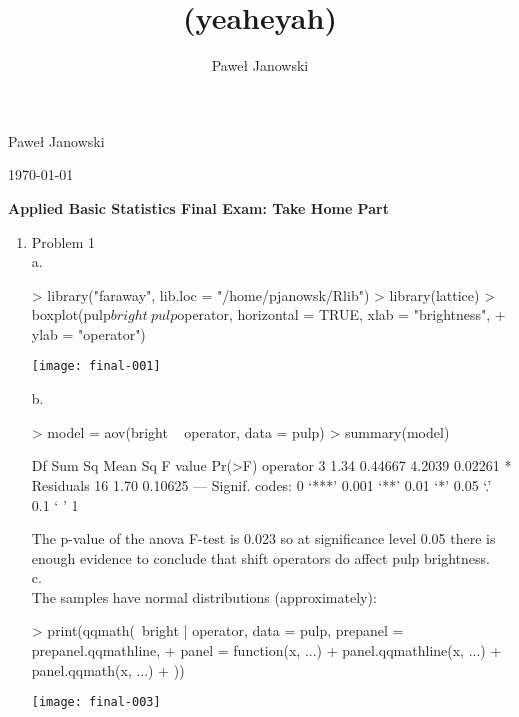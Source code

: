 \documentclass[11pt,letterpaper]{article}
\title{(yeaheyah)}
\author{Pawe\l{} Janowski}
\begin{document}
\begin{flushright}
\parskip 0pt
Pawe\l{} Janowski
 
\today
\vspace{10 mm}
\end{flushright}
\begin{center}
\begin{Large}
\textbf{Applied Basic Statistics
Final Exam: Take Home Part}
\vspace{10 mm}
\end{Large}
\end{center}


\begin{enumerate}
\item Problem 1 \\
a.

\begin{Schunk}
\begin{Sinput}
> library("faraway", lib.loc = "/home/pjanowsk/Rlib")
> library(lattice)
> boxplot(pulp$bright ~ pulp$operator, horizontal = TRUE, xlab = "brightness", 
+     ylab = "operator")
\end{Sinput}
\end{Schunk}
\texttt{[image: final-001]}

b.
\begin{Schunk}
\begin{Sinput}
> model = aov(bright ~ operator, data = pulp)
> summary(model)
\end{Sinput}
\begin{Soutput}
            Df Sum Sq Mean Sq F value  Pr(>F)  
operator     3   1.34 0.44667  4.2039 0.02261 *
Residuals   16   1.70 0.10625                  
---
Signif. codes:  0 ‘***’ 0.001 ‘**’ 0.01 ‘*’ 0.05 ‘.’ 0.1 ‘ ’ 1 
\end{Soutput}
\end{Schunk}

The p-value of the anova F-test is 0.023 so at significance level 0.05 there is enough evidence to conclude that shift operators do affect pulp brightness.\\

c. \\
The samples have normal distributions (approximately):

\begin{Schunk}
\begin{Sinput}
> print(qqmath(~bright | operator, data = pulp, prepanel = prepanel.qqmathline, 
+     panel = function(x, ...) {
+         panel.qqmathline(x, ...)
+         panel.qqmath(x, ...)
+     }))
\end{Sinput}
\end{Schunk}
\texttt{[image: final-003]}


\end{enumerate}
\end{document}
